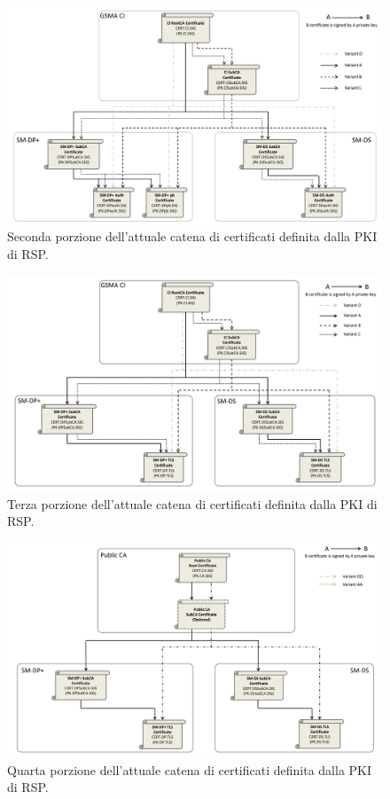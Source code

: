 \documentclass[10pt, twoside, openany]{book}
\begin{document}
\begin{figure}
\includegraphics[width=\linewidth]{cert-chain-new2.png}
\caption{Seconda porzione dell'attuale catena di certificati definita dalla PKI di RSP.}
\label{fig:cert-chain-new2}
\end{figure}
\begin{figure}
\includegraphics[width=\linewidth]{cert-chain-new3.png}
\caption{Terza porzione dell'attuale catena di certificati definita dalla PKI di RSP.}
\label{fig:cert-chain-new3}
\end{figure}
\begin{figure}
\includegraphics[width=\linewidth]{cert-chain-new4.png}
\caption{Quarta porzione dell'attuale catena di certificati definita dalla PKI di RSP.}
\label{fig:cert-chain-new4}
\end{figure}
\end{document}
